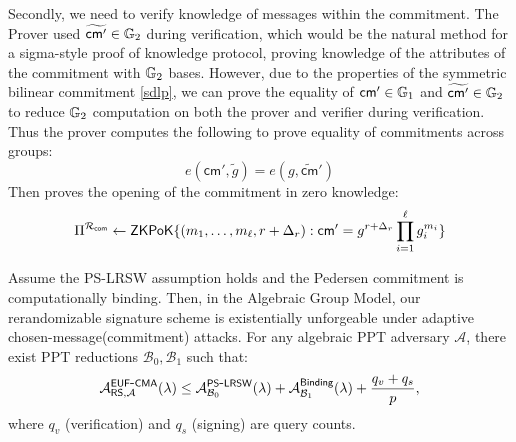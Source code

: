 Secondly, we need to verify knowledge of messages within the commitment. The Prover used $\widetilde{\mathsf{cm}'} \in \mathbb{G}_2$ during verification, which would be the natural method for a sigma-style proof of knowledge protocol, proving knowledge of the attributes of the commitment with $\mathbb{G}_2$ bases. However, due to the properties of the symmetric bilinear commitment \ref{sdlp}, we can prove the equality of $\mathsf{cm}' \in \mathbb{G}_1$ and $\widetilde{\mathsf{cm}'} \in \mathbb{G}_2$ to reduce $\mathbb{G}_2$ computation on both the prover and verifier during verification. 
Thus the prover computes the following to prove equality of commitments across groups:
\[
    e(\mathsf{cm}', \tilde{g}) = e(g, \widetilde{\mathsf{cm}}')
\]
Then proves the opening of the commitment in zero knowledge:
\[
 \Pi^{\mathcal{R}_{\mathsf{com}}}  \gets \mathsf{ZKPoK}\{(m_1,\ldots,m_\ell, r + \Delta_r): \mathsf{cm}' = g^{r + \Delta_r} \prod_{i=1}^\ell g_i^{m_i}\}
\]






\begin{theorem}
Assume the PS-LRSW assumption holds and the Pedersen commitment is computationally binding. Then, in the Algebraic Group Model, our rerandomizable signature scheme is existentially unforgeable under adaptive chosen-message(commitment) attacks. For any algebraic PPT adversary $\mathcal{A}$, there exist PPT reductions $\mathcal{B}_0, \mathcal{B}_1$ such that:
\[
\mathcal{A}^{\mathsf{EUF\mbox{-}CMA}}_{\mathsf{RS},\mathcal{A}}(\lambda) \leq \mathcal{A}^{\mathsf{PS\mbox{-}LRSW}}_{\mathcal{B}_0}(\lambda) + \mathcal{A}^{\mathsf{Binding}}_{\mathcal{B}_1}(\lambda) + \frac{q_v + q_s}{p},
\]
where $q_v$ (verification) and $q_s$ (signing) are query counts.
\end{theorem}

